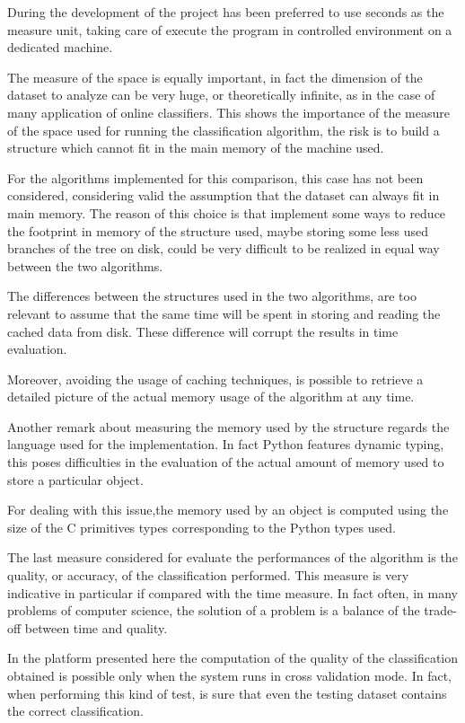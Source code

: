 \documentclass{acm_proc_article-sp-sigmod07}
\begin{document}
During the development of the project has been preferred to use seconds as
the measure unit, taking care of execute the program in controlled
environment on a dedicated machine.

The measure of the space is equally important, in fact the dimension of
the dataset to analyze can be very huge, or theoretically infinite, as in
the case of many application of online classifiers.
This shows the importance of the measure of the space used for running the
classification algorithm, the risk is to build a structure which cannot
fit in the main memory of the machine used.

For the algorithms implemented for this comparison, this case has not been
considered, considering valid the assumption that the dataset can always
fit in main memory.
The reason of this choice is that implement some ways to reduce the
footprint in memory of the structure used, maybe storing some less used
branches of the tree on disk, could be very difficult to be realized in
equal way between the two algorithms.

The differences between the structures used in the two algorithms, are too
relevant to assume that the same time will be spent in storing and reading
the cached data from disk. These difference will corrupt the results in
time evaluation.

Moreover, avoiding the usage of caching techniques, is possible to
retrieve a detailed picture of the actual memory usage of the algorithm at
any time. 

Another remark about measuring the memory used by the structure regards
the language used for the implementation.
In fact Python features dynamic typing, this poses difficulties in the
evaluation of the actual amount of memory used to store a
particular object.

For dealing with this issue,the memory used by an object is computed using
the size of the C primitives types corresponding to the Python types used.

The last measure considered for evaluate the performances of the
algorithm is the quality, or accuracy, of the classification performed. 
This measure is very indicative in particular if compared with the time
measure.
In fact often, in many problems of computer science, the solution of a
problem is a balance of the trade-off between time and quality.

In the platform presented here the computation of the quality of the
classification obtained is possible only when the system runs in cross
validation mode. In fact, when performing this kind of test, is sure that
even the testing dataset contains the correct classification.
\end{document}
